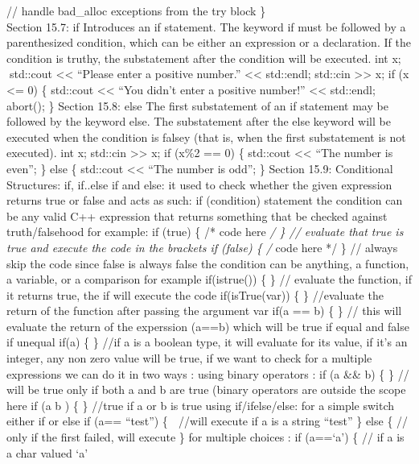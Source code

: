 // handle bad\_alloc exceptions from the try block \}\\
Section 15.7: if Introduces an if statement. The keyword if must be
followed by a parenthesized condition, which can be either an expression
or a declaration. If the condition is truthy, the substatement after the
condition will be executed. int x; std::cout \textless\textless{}
``Please enter a positive number.'' \textless\textless{} std::endl;
std::cin \textgreater\textgreater{} x; if (x \textless= 0) \{ std::cout
\textless\textless{} ``You didn't enter a positive number!''
\textless\textless{} std::endl; abort(); \} Section 15.8: else The ﬁrst
substatement of an if statement may be followed by the keyword else. The
substatement after the else keyword will be executed when the condition
is falsey (that is, when the ﬁrst substatement is not executed). int x;
std::cin \textgreater\textgreater{} x; if (x\%2 == 0) \{ std::cout
\textless\textless{} ``The number is even\n''; \} else \{ std::cout
\textless\textless{} ``The number is odd\n''; \} Section 15.9:
Conditional Structures: if, if..else if and else: it used to check
whether the given expression returns true or false and acts as such: if
(condition) statement the condition can be any valid C++ expression that
returns something that be checked against truth/falsehood for example:
if (true) \{ /* code here \emph{/ \} // evaluate that true is true and
execute the code in the brackets if (false) \{ /} code here */ \} //
always skip the code since false is always false the condition can be
anything, a function, a variable, or a comparison for example
if(istrue()) \{ \} // evaluate the function, if it returns true, the if
will execute the code if(isTrue(var)) \{ \} //evaluate the return of the
function after passing the argument var if(a == b) \{ \} // this will
evaluate the return of the experssion (a==b) which will be true if equal
and false if unequal if(a) \{ \} //if a is a boolean type, it will
evaluate for its value, if it's an integer, any non zero value will be
true, if we want to check for a multiple expressions we can do it in two
ways : using binary operators : if (a \&\& b) \{ \} // will be true only
if both a and b are true (binary operators are outside the scope here if
(a \textbar\textbar{} b ) \{ \} //true if a or b is true using
if/ifelse/else: for a simple switch either if or else if (a== ``test'')
\{  //will execute if a is a string ``test'' \} else \{ // only if the
first failed, will execute \} for multiple choices : if (a==`a') \{ //
if a is a char valued `a'\\
